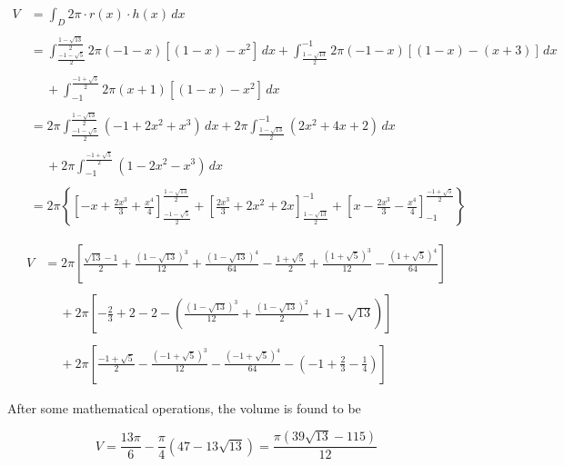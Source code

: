 \documentclass{article}
\begin{document}
\begin{align*}V&=\int_D2\pi\cdot r(x)\cdot h(x)\,dx\\\\&=\int_{\textstyle\frac{-1-\sqrt5}2}^{\textstyle\frac{1-\sqrt{13}}2}2\pi(-1-x)\left[\left(1-x\right)-x^2\right]\,dx+\int_{\textstyle\frac{1-\sqrt{13}}2}^{-1}2\pi(-1-x)\left[\left(1-x\right)-\left(x+3\right)\right]\,dx\\\\&\quad\:+\int_{-1}^{\textstyle\frac{-1+\sqrt5}2}2\pi\left(x+1\right)\left[\left(1-x\right)-x^2\right]\,dx\\\\&=2\pi\int_{\textstyle\frac{-1-\sqrt5}2}^{\textstyle\frac{1-\sqrt{13}}2}\left(-1+2x^2+x^3\right)\,dx+2\pi\int_{\textstyle\frac{1-\sqrt{13}}2}^{-1}\left(2x^2+4x+2\right)\,dx\\\\&\quad\:+2\pi\int_{-1}^{\textstyle\frac{-1+\sqrt5}2}\left(1-2x^2-x^3\right)\,dx\\\\&=2\pi\left\{\left[-x+\frac{2x^3}3+\frac{x^4}4\right]_{\textstyle\frac{-1-\sqrt5}2}^{\textstyle\frac{1-\sqrt{13}}2}+\left[\frac{2x^3}3+2x^2+2x\right]_{\textstyle\frac{1-\sqrt{13}}2}^{-1}+\left[x-\frac{2x^3}3-\frac{x^4}4\right]_{-1}^{\textstyle\frac{-1+\sqrt5}2}\right\}\end{align*}

\newpage

\begin{align*}V&=2\pi\left[\frac{\sqrt{13}-1}2+\frac{\left(1-\sqrt{13}\right)^3}{12}+\frac{\left(1-\sqrt{13}\right)^4}{64}-\frac{1+\sqrt5}2+\frac{\left(1+\sqrt5\right)^3}{12}-\frac{\left(1+\sqrt5\right)^4}{64}\right]\\\\&\quad\:+2\pi\left[-\frac23+2-2-\left(\frac{\left(1-\sqrt{13}\right)^3}{12}+\frac{\left(1-\sqrt{13}\right)^2}2+1-\sqrt{13}\right)\right]\\\\&\quad\:+2\pi\left[\frac{-1+\sqrt5}2-\frac{\left(-1+\sqrt5\right)^3}{12}-\frac{\left(-1+\sqrt5\right)^4}{64}-\left(-1+\frac23-\frac14\right)\right]\end{align*}

\hfill

\noindent After some mathematical operations, the volume is found to be

\[V=\frac{13\pi}6-\frac{\pi}4\left(47-13\sqrt{13}\right)=\boxed{\frac{\pi\left(39\sqrt{13}-115\right)}{12}}\]
\end{document}
